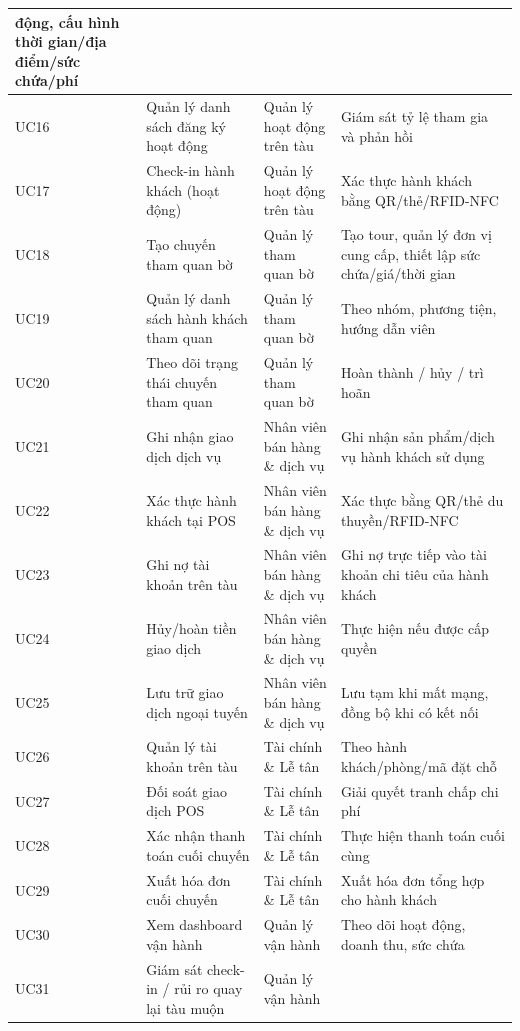 \begin{longtable}{|p{1.2cm}|p{4.0cm}|p{3.5cm}|p{9.3cm}|}
    động, cấu hình thời gian/địa điểm/sức chứa/phí \\
    \hline
    UC16 & Quản lý danh sách đăng ký hoạt động & Quản lý hoạt động trên tàu
    & Giám sát tỷ lệ tham gia và phản hồi \\
    \hline
    UC17 & Check-in hành khách (hoạt động) & Quản lý hoạt động trên tàu &
    Xác thực hành khách bằng QR/thẻ/RFID-NFC \\
    \hline
    UC18 & Tạo chuyến tham quan bờ & Quản lý tham quan bờ & Tạo tour, quản
    lý đơn vị cung cấp, thiết lập sức chứa/giá/thời gian \\
    \hline
    UC19 & Quản lý danh sách hành khách tham quan & Quản lý tham quan bờ &
    Theo nhóm, phương tiện, hướng dẫn viên \\
    \hline
    UC20 & Theo dõi trạng thái chuyến tham quan & Quản lý tham quan bờ &
    Hoàn thành / hủy / trì hoãn \\
    \hline
    UC21 & Ghi nhận giao dịch dịch vụ & Nhân viên bán hàng \& dịch vụ & Ghi
    nhận sản phẩm/dịch vụ hành khách sử dụng \\
    \hline
    UC22 & Xác thực hành khách tại POS & Nhân viên bán hàng \& dịch vụ &
    Xác thực bằng QR/thẻ du thuyền/RFID-NFC \\
    \hline
    UC23 & Ghi nợ tài khoản trên tàu & Nhân viên bán hàng \& dịch vụ & Ghi
    nợ trực tiếp vào tài khoản chi tiêu của hành khách \\
    \hline
    UC24 & Hủy/hoàn tiền giao dịch & Nhân viên bán hàng \& dịch vụ & Thực
    hiện nếu được cấp quyền \\
    \hline
    UC25 & Lưu trữ giao dịch ngoại tuyến & Nhân viên bán hàng \& dịch vụ &
    Lưu tạm khi mất mạng, đồng bộ khi có kết nối \\
    \hline
    UC26 & Quản lý tài khoản trên tàu & Tài chính \& Lễ tân & Theo hành
    khách/phòng/mã đặt chỗ \\
    \hline
    UC27 & Đối soát giao dịch POS & Tài chính \& Lễ tân & Giải quyết tranh
    chấp chi phí \\
    \hline
    UC28 & Xác nhận thanh toán cuối chuyến & Tài chính \& Lễ tân & Thực
    hiện thanh toán cuối cùng \\
    \hline
    UC29 & Xuất hóa đơn cuối chuyến & Tài chính \& Lễ tân & Xuất hóa đơn
    tổng hợp cho hành khách \\
    \hline
    UC30 & Xem dashboard vận hành & Quản lý vận hành & Theo dõi hoạt động,
    doanh thu, sức chứa \\
    \hline
    UC31 & Giám sát check-in / rủi ro quay lại tàu muộn & Quản lý vận hành

\end{longtable}
